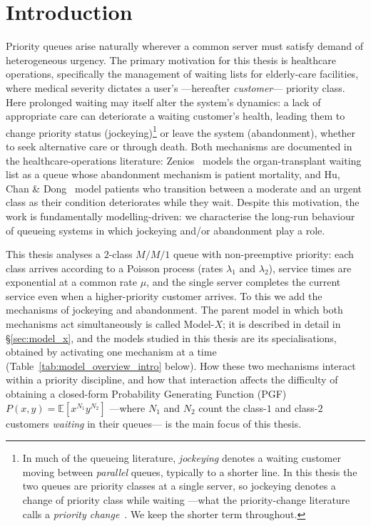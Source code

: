 \section{Introduction}

Priority queues arise naturally wherever a common server must satisfy demand of heterogeneous urgency. The primary motivation for this thesis is healthcare operations, specifically the management of waiting lists for elderly-care facilities, where medical severity dictates a user's ---hereafter \emph{customer}--- priority class. Here prolonged waiting may itself alter the system's dynamics: a lack of appropriate care can deteriorate a waiting customer's health, leading them to change priority status (jockeying)\footnote{In much of the queueing literature, \emph{jockeying} denotes a waiting customer moving between \emph{parallel} queues, typically to a shorter line. In this thesis the two queues are priority classes at a single server, so jockeying denotes a change of priority class while waiting ---what the priority-change literature calls a \emph{priority change}~\cite{deWaal1992approximate,huchandong2022proactive}. We keep the shorter term throughout.} or leave the system (abandonment), whether to seek alternative care or through death. Both mechanisms are documented in the healthcare-operations literature: Zenios~\cite{zenios1999modeling} models the organ-transplant waiting list as a queue whose abandonment mechanism is patient mortality, and Hu, Chan \& Dong~\cite{huchandong2022proactive} model patients who transition between a moderate and an urgent class as their condition deteriorates while they wait. Despite this motivation, the work is fundamentally modelling-driven: we characterise the long-run behaviour of queueing systems in which jockeying and/or abandonment play a role.

This thesis analyses a $2$-class $M/M/1$ queue with non-preemptive priority: each class arrives according to a Poisson process (rates $\lambda_1$ and $\lambda_2$), service times are exponential at a common rate $\mu$, and the single server completes the current service even when a higher-priority customer arrives. To this we add the mechanisms of jockeying and abandonment. The parent model in which both mechanisms act simultaneously is called Model-$X$; it is described in detail in \S\ref{sec:model_x}, and the models studied in this thesis are its specialisations, obtained by activating one mechanism at a time (Table~\ref{tab:model_overview_intro} below). How these two mechanisms interact within a priority discipline, and how that interaction affects the difficulty of obtaining a closed-form Probability Generating Function (PGF) $P(x,y)=\mathbb{E}[x^{N_1}y^{N_2}]$ ---where $N_1$ and $N_2$ count the class-$1$ and class-$2$ customers \emph{waiting} in their queues--- is the main focus of this thesis.

